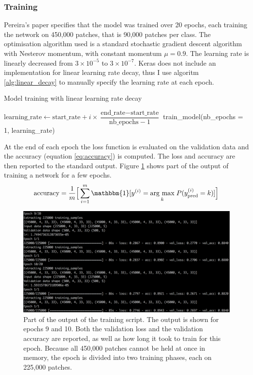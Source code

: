 \documentclass[12pt,a4paper,twoside,openright]{report}
\newcommand{\argmax}[1]{\underset{#1}{\operatorname{arg}\,\operatorname{max}}\;} %
\begin{document}
\subsubsection{Training}
Pereira's paper specifies that the model was trained over 20 epochs, each training the network on 450,000 patches, that is 90,000 patches per class. The optimisation algorithm used is a standard stochastic gradient descent algorithm with Nesterov momentum, with constant momentum $\mu = 0.9$. The learning rate is linearly decreased from $3 \times 10^{-5}$ to $3 \times 10^{-7}$. Keras does not include an implementation for linear learning rate decay, thus I use algoritm \ref{alg:linear_decay} to manually specify the learning rate at each epoch.

\begin{algorithm}
\caption{Model training with linear learning rate decay}
\label{alg:linear_decay}
\begin{algorithmic}[1]
	\State $\text{learning\_rate} \gets \text{start\_rate} + i \times \dfrac{\text{end\_rate} - \text{start\_rate} }{ \text{nb\_epochs} - 1 }$
	\State train\_model(nb\_epochs = 1, learning\_rate)
\EndFor
\end{algorithmic}
\end{algorithm}

At the end of each epoch the loss function is evaluated on the validation data and the accuracy (equation \ref{eq:accuracy}) is computed. The loss and accuracy are then reported to the standard output. Figure \ref{fig:training_output} shows part of the output of training a network for a few epochs.
\begin{equation}
	\label{eq:accuracy}
		\text{accuracy} = 
	\frac{1}{m}\Big[\sum_{i=1}^m\mathbbm{1}[y^{(i)} = \argmax{k}P(y_{\text{pred}}^{(i)}=k)]\Big]
\end{equation}
\begin{figure}
	\centering
	\includegraphics[width=\textwidth]{training_output}
	\caption[Part of the output of the training script.]{Part of the output of the training script. The output is shown for epochs 9 and 10. Both the validation loss and the validation accuracy are reported, as well as how long it took to train for this epoch. Because all 450,000 patches cannot be held at once in memory, the epoch is divided into two training phases, each on 225,000 patches.}
	\label{fig:training_output}
\end{figure}
\end{document}

